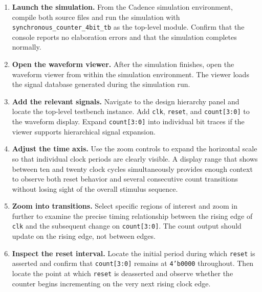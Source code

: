 \begin{enumerate}
    \item \textbf{Launch the simulation.} From the Cadence simulation
          environment, compile both source files and run the simulation with
          \texttt{synchronous\_counter\_4bit\_tb} as the top-level module.
          Confirm that the console reports no elaboration errors and that
          the simulation completes normally.

    \item \textbf{Open the waveform viewer.} After the simulation finishes,
          open the waveform viewer from within the simulation environment. The
          viewer loads the signal database generated during the simulation run.

    \item \textbf{Add the relevant signals.} Navigate to the design hierarchy
          panel and locate the top-level testbench instance. Add \texttt{clk},
          \texttt{reset}, and \texttt{count[3:0]} to the waveform display.
          Expand \texttt{count[3:0]} into individual bit traces if the viewer
          supports hierarchical signal expansion.

    \item \textbf{Adjust the time axis.} Use the zoom controls to expand the
          horizontal scale so that individual clock periods are clearly visible.
          A display range that shows between ten and twenty clock cycles
          simultaneously provides enough context to observe both reset behavior
          and several consecutive count transitions without losing sight of
          the overall stimulus sequence.

    \item \textbf{Zoom into transitions.} Select specific regions of interest
          and zoom in further to examine the precise timing relationship
          between the rising edge of \texttt{clk} and the subsequent change
          on \texttt{count[3:0]}. The count output should update on the rising
          edge, not between edges.

    \item \textbf{Inspect the reset interval.} Locate the initial period during
          which \texttt{reset} is asserted and confirm that \texttt{count[3:0]}
          remains at \texttt{4'b0000} throughout. Then locate the point at
          which \texttt{reset} is deasserted and observe whether the counter
          begins incrementing on the very next rising clock edge.
\end{enumerate}

